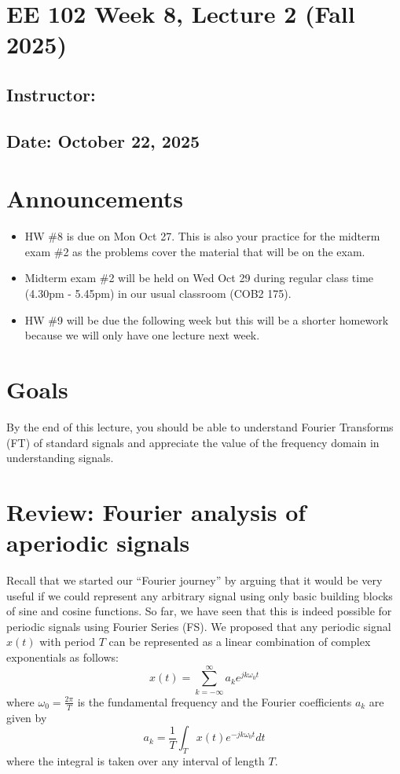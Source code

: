 \documentclass{ee102_notes}
\renewcommand{\releasedate}{October 22, 2025}
\begin{document}
\section*{EE 102 Week 8, Lecture 2 (Fall 2025)}
\subsection*{Instructor: \instructor}
\subsection*{Date: \releasedate}
\section{Announcements}
\begin{itemize}
    \item HW \#8 is due on Mon Oct 27. This is also your practice for the midterm exam \#2 as the problems cover the material that will be on the exam.
    \item Midterm exam \#2 will be held on Wed Oct 29 during regular class time (4.30pm - 5.45pm) in our usual classroom (COB2 175).
    \item HW \#9 will be due the following week but this will be a shorter homework because we will only have one lecture next week.
\end{itemize}
\section{Goals}

By the end of this lecture, you should be able to understand Fourier Transforms (FT) of standard signals and appreciate the value of the frequency domain in understanding signals.

\section{Review: Fourier analysis of aperiodic signals}
Recall that we started our ``Fourier journey'' by arguing that it would be very useful if we could represent any arbitrary signal using only basic building blocks of sine and cosine functions. So far, we have seen that this is indeed possible for periodic signals using Fourier Series (FS). We proposed that any periodic signal $x(t)$ with period $T$ can be represented as a linear combination of complex exponentials as follows:
\begin{equation} 
  \label{eq:fs_synthesis}
  x(t) = \sum_{k=-\infty}^{\infty} a_k e^{jk\omega_0 t}
\end{equation}
where $\omega_0 = \frac{2\pi}{T}$ is the fundamental frequency and the Fourier coefficients $a_k$ are given by
\begin{equation}
  \label{eq:fs_analysis}
  a_k = \frac{1}{T} \int_{T} x(t) e^{-jk\omega_0 t} dt
\end{equation}
where the integral is taken over any interval of length $T$.
\end{document}
